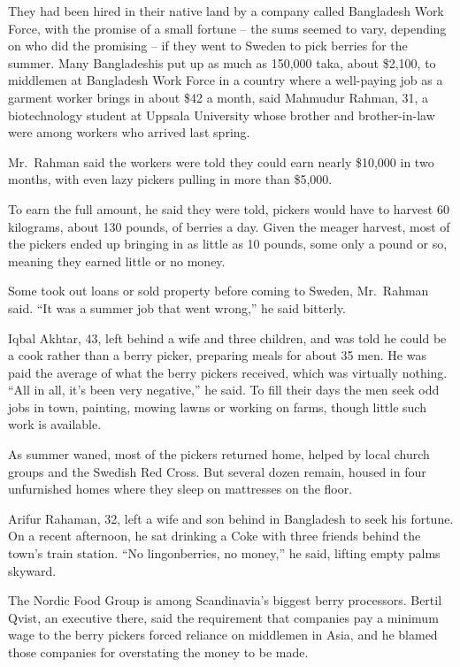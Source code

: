 ﻿\documentclass[12pt]{article}
\begin{document}
They had been hired in their native land by a company called Bangladesh Work Force, with the promise
of a small fortune -- the sums seemed to vary, depending on who did the promising -- if they went to
Sweden to pick berries for the summer. Many Bangladeshis put up as much as 150,000 taka, about
\$2,100, to middlemen at Bangladesh Work Force in a country where a well-paying job as a garment
worker brings in about \$42 a month, said Mahmudur Rahman, 31, a biotechnology student at Uppsala
University whose brother and brother-in-law were among workers who arrived last spring.

Mr.~Rahman said the workers were told they could earn nearly \$10,000 in two months, with even lazy
pickers pulling in more than \$5,000.

To earn the full amount, he said they were told, pickers would have to harvest 60 kilograms, about
130 pounds, of berries a day. Given the meager harvest, most of the pickers ended up bringing in as
little as 10 pounds, some only a pound or so, meaning they earned little or no money.

Some took out loans or sold property before coming to Sweden, Mr.~Rahman said. ``It was a summer job
that went wrong,'' he said bitterly.

Iqbal Akhtar, 43, left behind a wife and three children, and was told he could be a cook rather than
a berry picker, preparing meals for about 35 men. He was paid the average of what the berry pickers
received, which was virtually nothing. ``All in all, it's been very negative,'' he said. To fill
their days the men seek odd jobs in town, painting, mowing lawns or working on farms, though little
such work is available.

As summer waned, most of the pickers returned home, helped by local church groups and the Swedish
Red Cross. But several dozen remain, housed in four unfurnished homes where they sleep on mattresses
on the floor.

Arifur Rahaman, 32, left a wife and son behind in Bangladesh to seek his fortune. On a recent
afternoon, he sat drinking a Coke with three friends behind the town's train station. ``No
lingonberries, no money,'' he said, lifting empty palms skyward.

The Nordic Food Group is among Scandinavia's biggest berry processors. Bertil Qvist, an executive
there, said the requirement that companies pay a minimum wage to the berry pickers forced reliance
on middlemen in Asia, and he blamed those companies for overstating the money to be made.
\end{document}
